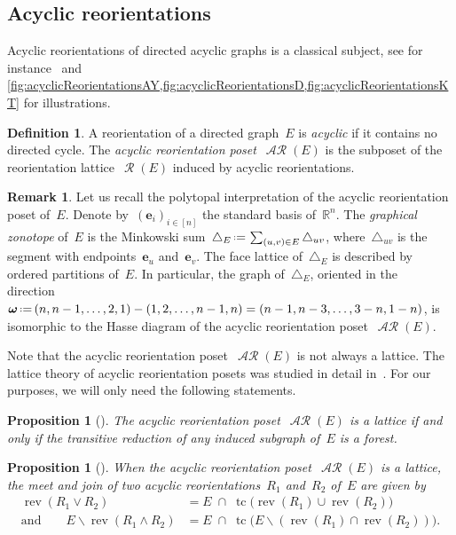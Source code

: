 \documentclass{amsart}
\newtheorem{proposition}[theorem]{Proposition}
\theoremstyle{definition}
\newtheorem{definition}[theorem]{Definition}
\newtheorem{remark}[theorem]{Remark}
\newcommand{\R}{\mathbb{R}} %
\renewcommand{\b}[1]{\boldsymbol{#1}} %
\renewcommand{\c}[1]{\mathcal{#1}} %
\newcommand{\ssm}{\smallsetminus} %
\newcommand{\eqdef}{\mbox{\,\raisebox{0.2ex}{\scriptsize\ensuremath{\mathrm:}}\ensuremath{=}\,}} %
\newcommand{\simplex}{\triangle} %
\DeclareMathOperator{\tc}{tc} %
\newcommand{\darkblue}{\color{darkblue}} %
\newcommand{\defn}[1]{\textsl{\darkblue #1}} %
\newcommand{\meet}{\wedge} %
\newcommand{\join}{\vee} %
\DeclareMathOperator{\Reori}{\c{R}}  %
\DeclareMathOperator{\AReori}{\c{AR}}  %
\DeclareMathOperator{\rev}{rev} %
\begin{document}
\subsection{Acyclic reorientations}
\label{subsec:acyclicReorientations}

Acyclic reorientations of directed acyclic graphs is a classical subject, see for instance~\cite{Greene,GreeneZaslavsky,Pilaud-acyclicReorientationLattices} and \cref{fig:acyclicReorientationsAY,fig:acyclicReorientationsD,fig:acyclicReorientationsKT} for illustrations.

\begin{definition}
\label{def:AReori}
A reorientation of a directed graph~$E$ is \defn{acyclic} if it contains no directed cycle.
The \defn{acyclic reorientation poset}~$\AReori(E)$ is the subposet of the reorientation lattice~$\Reori(E)$ induced by acyclic reorientations.
\end{definition}

\begin{remark}
Let us recall the polytopal interpretation of the acyclic reorientation poset of~$E$.
Denote by~$(\b{e}_i)_{i \in [n]}$ the standard basis of~$\R^n$.
The \defn{graphical zonotope} of~$E$ is the Minkowski sum~$\simplex_E \eqdef \sum_{(u,v) \in E} \simplex_{uv}$, where~$\simplex_{uv}$ is the segment with endpoints~$\b{e}_u$ and~$\b{e}_v$.
The face lattice of~$\simplex_E$ is described by ordered partitions of~$E$.
In particular, the graph of~$\simplex_E$, oriented in the direction~$\b{\omega} \eqdef (n, n-1, \dots, 2, 1) - (1, 2, \dots, n-1, n) = (n-1, n-3, \dots, 3-n, 1-n)$, is isomorphic to the Hasse diagram of the acyclic reorientation poset~$\AReori(E)$.
\end{remark}

Note that the acyclic reorientation poset~$\AReori(E)$ is not always a lattice.
The lattice theory of acyclic reorientation posets was studied in detail in~\cite{Pilaud-acyclicReorientationLattices}.
For our purposes, we will only need the following statements.

\begin{proposition}[{\cite[Thm.~1]{Pilaud-acyclicReorientationLattices}}]
\label{prop:AReoriLat}
The acyclic reorientation poset~$\AReori(E)$ is a lattice if and only if the transitive reduction of any induced subgraph of~$E$ is a forest.
\end{proposition}

\begin{proposition}[{\cite[Thm.~9]{Pilaud-acyclicReorientationLattices}}]
\label{prop:AReoriLatJoinMeet}
When the acyclic reorientation poset~$\AReori(E)$ is a lattice, the meet and join of two acyclic reorientations~$R_1$ and~$R_2$ of~$E$ are given by
\begin{align*}
\rev(R_1 \join R_2) & = E \;\cap\; \tc \!\big( \rev(R_1) \cup \rev(R_2) \big) \\
\text{and}\qquad
E \ssm \rev(R_1 \meet R_2) & = E \;\cap\; \tc \!\big( E \ssm (\rev(R_1) \cap \rev(R_2)) \big).
\end{align*}
\end{proposition}
\end{document}
